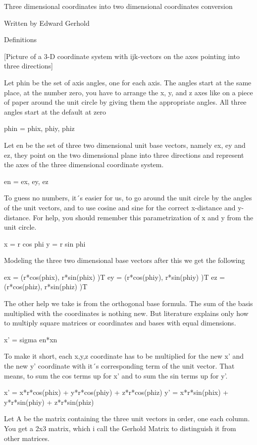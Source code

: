 
Three dimensional coordinates into two dimensional coordinates conversion

Written by Edward Gerhold

Definitions

[Picture of a 3-D coordinate system with ijk-vectors on the axes pointing
into three directions]

Let phin be the set of axis angles, one for each axis. The angles start
at the same place, at the number zero, you have to arrange the x, y, and
z axes like on a piece of paper around the unit circle by giving them the
appropriate angles. All three angles start at the default at zero

phin = { phix, phiy, phiz }

Let en be the set of three two dimensional unit base vectors, namely ex,
ey and ez, they point on the two dimensional plane into three directions
and represent the axes of the three dimensional coordinate system.

en = { ex, ey, ez }
 
To guess no numbers, it´s easier for us, to go around the unit circle by
the angles of the unit vectors, and to use cosine and sine for the correct
x-distance and y-distance. For help, you should remember this parametrization
of x and y from the unit circle.

x = r cos phi
y = r sin phi

Modeling the three two dimensional base vectors after this we get the following

ex = (r*cos(phix), r*sin(phix) )T
ey = (r*cos(phiy), r*sin(phiy) )T
ez = (r*cos(phiz), r*sin(phiz) )T

The other help we take is from the orthogonal base formula.
The sum of the basis multiplied with the coordinates is nothing
new. But literature explains only how to multiply square matrices
or coordinates and bases with equal dimensions.

x' = sigma en*xn

To make it short, each x,y,z coordinate has to be multiplied for the new x' and
the new y' coordinate with it´s corresponding term of the unit vector. That means,
to sum the cos terms up for x' and to sum the sin terms up for y'.

x' = x*r*cos(phix) + y*r*cos(phiy) + z*r*cos(phiz)
y' = x*r*sin(phix) + y*r*sin(phiy) + z*r*sin(phiz)

Let A be the matrix containing the three unit vectors in order, one each
column. You get a 2x3 matrix, which i call the Gerhold Matrix to distinguish 
it from other matrices.

